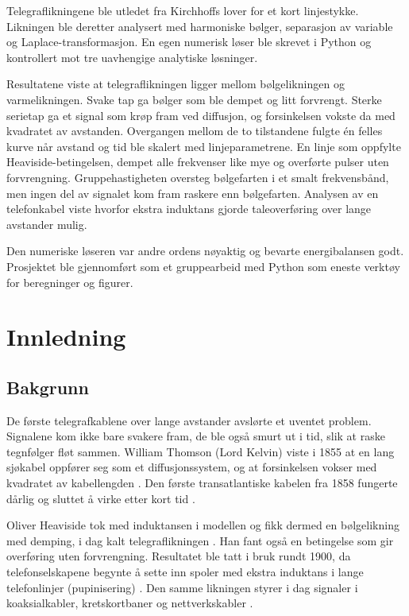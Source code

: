 \documentclass[11pt,a4paper]{article}
\numberwithin{equation}{section}
\numberwithin{figure}{section}
\numberwithin{table}{section}
\begin{document}
Telegraflikningene ble utledet fra Kirchhoffs lover for et kort linjestykke.
Likningen ble deretter analysert med harmoniske bølger, separasjon av variable og
Laplace-transformasjon. En egen numerisk løser ble skrevet i Python og kontrollert
mot tre uavhengige analytiske løsninger.

Resultatene viste at telegraflikningen ligger mellom bølgelikningen og
varmelikningen. Svake tap ga bølger som ble dempet og litt forvrengt. Sterke
serietap ga et signal som krøp fram ved diffusjon, og forsinkelsen vokste da med
kvadratet av avstanden. Overgangen mellom de to tilstandene fulgte én felles kurve
når avstand og tid ble skalert med linjeparametrene. En linje som oppfylte
Heaviside-betingelsen, dempet alle frekvenser like mye og overførte pulser uten
forvrengning. Gruppehastigheten oversteg bølgefarten i et smalt frekvensbånd, men
ingen del av signalet kom fram raskere enn bølgefarten. Analysen av en telefonkabel
viste hvorfor ekstra induktans gjorde taleoverføring over lange avstander mulig.

Den numeriske løseren var andre ordens nøyaktig og bevarte energibalansen godt.
Prosjektet ble gjennomført som et gruppearbeid med Python som eneste verktøy for
beregninger og figurer.

\clearpage
\thispagestyle{plain}
{\setlength{\parskip}{0pt}\tableofcontents}
\clearpage

\setcounter{page}{1}
\section{Innledning}

\subsection{Bakgrunn}
De første telegrafkablene over lange avstander avslørte et uventet problem.
Signalene kom ikke bare svakere fram, de ble også smurt ut i tid, slik at raske
tegnfølger fløt sammen. William Thomson (Lord Kelvin) viste i 1855 at en lang
sjøkabel oppfører seg som et diffusjonssystem, og at forsinkelsen vokser med
kvadratet av kabellengden \cite{thomson1855}. Den første transatlantiske kabelen
fra 1858 fungerte dårlig og sluttet å virke etter kort tid \cite{nahin2002}.

Oliver Heaviside tok med induktansen i modellen og fikk dermed en
bølgelikning med demping, i dag kalt telegraflikningen \cite{heaviside1893}. Han
fant også en betingelse som gir overføring uten forvrengning. Resultatet ble tatt
i bruk rundt 1900, da telefonselskapene begynte å sette inn spoler med ekstra
induktans i lange telefonlinjer (pupinisering) \cite{nahin2002}. Den samme
likningen styrer i dag signaler i koaksialkabler, kretskortbaner og
nettverkskabler \cite{pozar2012}.
\end{document}
